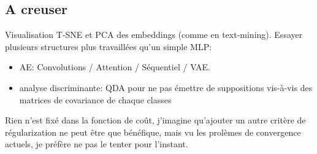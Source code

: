 \subsection{A creuser}



Visualisation T-SNE et PCA des embeddings (comme en text-mining).
Essayer plusieurs structures plus travaillées qu'un simple MLP:
\begin{itemize}
    \item AE: Convolutions / Attention / Séquentiel / VAE.
    \item analyse discriminante: QDA  pour ne pas émettre de suppositions vis-à-vis des matrices de covariance de chaque classes
\end{itemize}

Rien n'est fixé dans la fonction de coût, j'imagine qu'ajouter un autre critère de régularization ne peut être que bénéfique, mais vu les prolèmes de convergence actuels, je préfère ne pas le tenter pour l'instant.

